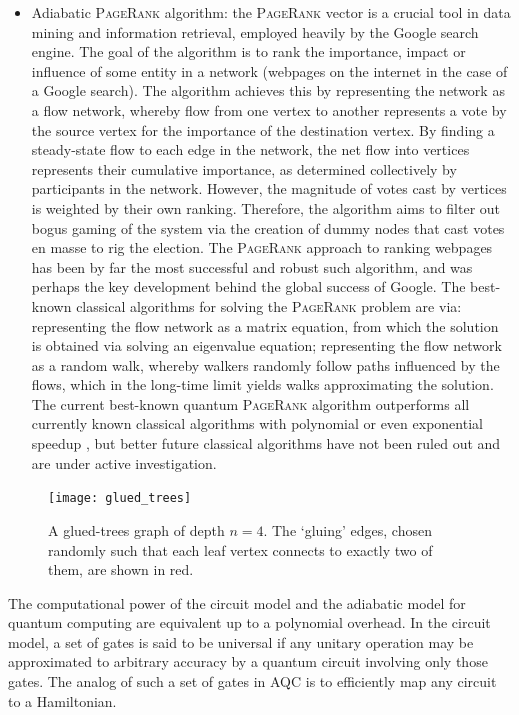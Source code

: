 \begin{itemize}
\item Adiabatic \textsc{PageRank} algorithm: the \textsc{PageRank} vector is a crucial tool in data mining and information retrieval, employed heavily by the Google search engine. The goal of the algorithm is to rank the importance, impact or influence of some entity in a network (webpages on the internet in the case of a Google search). The algorithm achieves this by representing the network as a flow network, whereby flow from one vertex to another represents a vote by the source vertex for the importance of the destination vertex. By finding a steady-state flow to each edge in the network, the net flow into vertices represents their cumulative importance, as determined collectively by participants in the network. However, the magnitude of votes cast by vertices is weighted by their own ranking. Therefore, the algorithm aims to filter out bogus gaming of the system via the creation of dummy nodes that cast votes en masse to rig the election. The \textsc{PageRank} approach to ranking webpages has been by far the most successful and robust such algorithm, and was perhaps the key development behind the global success of Google. The best-known classical algorithms for solving the \textsc{PageRank} problem are via: representing the flow network as a matrix equation, from which the solution is obtained via solving an eigenvalue equation; representing the flow network as a random walk, whereby walkers randomly follow paths influenced by the flows, which in the long-time limit yields walks approximating the solution. The current best-known quantum \textsc{PageRank} algorithm outperforms all currently known classical algorithms with polynomial or even exponential speedup \cite{bib:PhysRevLett.108.230506}, but better future classical algorithms have not been ruled out and are under active investigation.
\end{itemize}

\begin{figure}[!htbp]
	\texttt{[image: glued\_trees]}
	\captionspacefig \caption{A glued-trees graph of depth \mbox{$n=4$}. The `gluing' edges, chosen randomly such that each leaf vertex connects to exactly two of them, are shown in red.} \label{fig:glued_trees}
\end{figure}

The computational power of the circuit model and the adiabatic model for quantum computing are equivalent up to a polynomial overhead. In the circuit model, a set of gates is said to be universal if any unitary operation may be approximated to arbitrary accuracy by a quantum circuit involving only those gates. The analog of such a set of gates in AQC is to efficiently map any circuit to a Hamiltonian.

